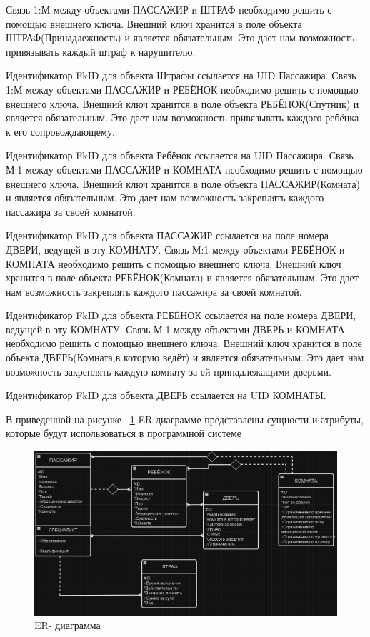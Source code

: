 Связь 1:М между объектами ПАССАЖИР и ШТРАФ необходимо решить с помощью внешнего ключа. 
Внешний ключ хранится в поле объекта ШТРАФ(Принадлежность) и является обязательным. Это дает нам возможность привязывать каждый штраф к нарушителю.
 
Идентификатор FkID для объекта Штрафы ссылается на UID Пассажира.
Связь 1:М между объектами ПАССАЖИР и РЕБЁНОК необходимо решить с помощью внешнего ключа. 
Внешний ключ хранится в поле объекта РЕБЁНОК(Спутник) и является обязательным. Это дает нам возможность привязывать каждого ребёнка к его сопровождающему.
 
Идентификатор FkID для объекта Ребёнок ссылается на UID Пассажира.
Связь М:1 между объектами ПАССАЖИР и КОМНАТА необходимо решить с помощью внешнего ключа. 
Внешний ключ хранится в поле объекта ПАССАЖИР(Комната) и является обязательным. Это дает нам возможность закреплять каждого пассажира за своей комнатой.
 
Идентификатор FkID для объекта ПАССАЖИР ссылается на поле номера ДВЕРИ, ведущей в эту КОМНАТУ.
Связь М:1 между объектами РЕБЁНОК и КОМНАТА необходимо решить с помощью внешнего ключа. 
Внешний ключ хранится в поле объекта РЕБЁНОК(Комната) и является обязательным. Это дает нам возможность закреплять каждого пассажира за своей комнатой.
 
Идентификатор FkID для объекта РЕБЁНОК ссылается на поле номера ДВЕРИ, ведущей в эту КОМНАТУ.
Связь М:1 между объектами ДВЕРЬ и КОМНАТА необходимо решить с помощью внешнего ключа. 
Внешний ключ хранится в поле объекта ДВЕРЬ(Комната,в которую ведёт) и является обязательным. Это дает нам возможность закреплять каждую комнату за ей принадлежащими дверьми.
 
Идентификатор FkID для объекта ДВЕРЬ ссылается на UID  КОМНАТЫ.

В приведенной на рисунке ~\ref{fig:er} ER-диаграмме представлены сущности и атрибуты, которые будут использоваться в программной системе 
\begin{figure}
	\centering
	\includegraphics[width=1\linewidth]{images/ER}
	\caption{ER- диаграмма}
	\label{fig:er}
\end{figure}

